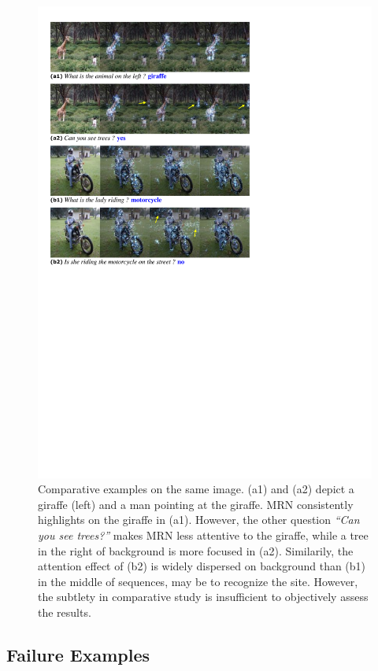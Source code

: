 \begin{figure}[ht!]
\centering
\includegraphics[width=.7\linewidth]{comp_reduced}
\caption{Comparative examples on the same image. (a1) and (a2) depict a giraffe (left) and a man pointing at the giraffe. MRN consistently highlights on the giraffe in (a1). However, the other question \textit{``Can you see trees?''} makes MRN less attentive to the giraffe, while a tree in the right of background is more focused in (a2). Similarily, the attention effect of (b2) is widely dispersed on background than (b1) in the middle of sequences, may be to recognize the site. However, the subtlety in comparative study is insufficient to objectively assess the results.}
\label{fig:comp}
\end{figure}

\newpage
\subsection{Failure Examples}

